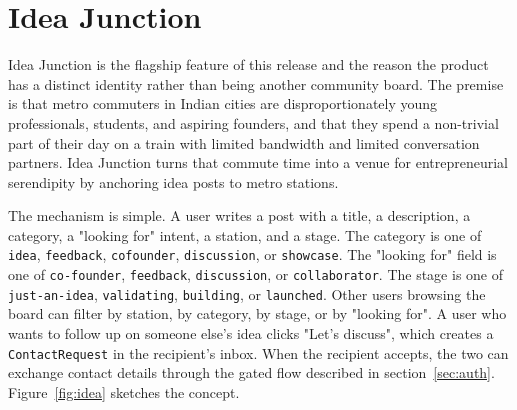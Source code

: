 \documentclass[a4paper,11pt]{article}
\begin{document}

\section{Idea Junction}
\label{sec:idea-junction}

Idea Junction is the flagship feature of this release and the reason the
product has a distinct identity rather than being another community board. The
premise is that metro commuters in Indian cities are disproportionately young
professionals, students, and aspiring founders, and that they spend a
non-trivial part of their day on a train with limited bandwidth and limited
conversation partners. Idea Junction turns that commute time into a venue for
entrepreneurial serendipity by anchoring idea posts to metro stations.

The mechanism is simple. A user writes a post with a title, a description, a
category, a "looking for" intent, a station, and a stage. The category is one
of \texttt{idea}, \texttt{feedback}, \texttt{cofounder}, \texttt{discussion},
or \texttt{showcase}. The "looking for" field is one of \texttt{co-founder},
\texttt{feedback}, \texttt{discussion}, or \texttt{collaborator}. The stage is
one of \texttt{just-an-idea}, \texttt{validating}, \texttt{building}, or
\texttt{launched}. Other users browsing the board can filter by station, by
category, by stage, or by "looking for". A user who wants to follow up on
someone else's idea clicks "Let's discuss", which creates a
\texttt{ContactRequest} in the recipient's inbox. When the recipient accepts,
the two can exchange contact details through the gated flow described in
section~\ref{sec:auth}. Figure~\ref{fig:idea} sketches the concept.
\end{document}

